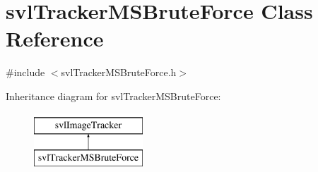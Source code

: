 \hypertarget{classsvl_tracker_m_s_brute_force}{}\section{svl\+Tracker\+M\+S\+Brute\+Force Class Reference}
\label{classsvl_tracker_m_s_brute_force}


{\ttfamily \#include $<$svl\+Tracker\+M\+S\+Brute\+Force.\+h$>$}

Inheritance diagram for svl\+Tracker\+M\+S\+Brute\+Force\+:\begin{figure}[H]
\begin{center}
\leavevmode
\includegraphics[height=2.000000cm]{dd/dd3/classsvl_tracker_m_s_brute_force}
\end{center}
\end{figure}
